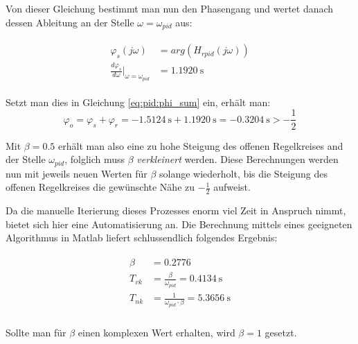 Von dieser Gleichung bestimmt man nun den Phasengang und wertet danach dessen
Ableitung an der Stelle $\omega = \omega_{pid}$ aus:

\begin{gather} \label{eq:pid:phi_r_first_iteration}
    \begin{split}
        \varphi_s (j\omega)                                            & = arg(H_{rpid}(j\omega))        \\
        \frac{d\varphi_s}{d\omega} \biggr \rvert_{\omega=\omega_{pid}} & = \SI{1.1920}{\second}
    \end{split}
\end{gather}


Setzt man dies in Gleichung \ref{eq:pid:phi_sum} ein, erh\"alt man:
\begin{equation} \label{eq:pid:phi_sum_result_iteration_one}
    \varphi_o = \varphi_s + \varphi_r =\SI{-1.5124}{\second} + \SI{1.1920}{\second} = \SI{-0.3204}{\second} > -\frac{1}{2}
\end{equation}

Mit  $\beta  = 0.5$  erh\"alt  man  also eine  zu  hohe  Steigung des  offenen
Regelkreises   and   der   Stelle  $\omega_{pid}$,   folglich   muss   $\beta$
{\em{verkleinert}} werden.   Diese Berechnungen  werden nun mit  jeweils neuen
Werten  f\"ur  $\beta$  solange  wiederholt,  bis  die  Steigung  des  offenen
Regelkreises die gew\"unschte N\"ahe zu $-\frac{1}{2}$ aufweist.

Da die manuelle Iterierung dieses Prozesses enorm viel Zeit in Anspruch nimmt,
bietet  sich  hier  eine  Automatisierung  an. Die  Berechnung  mittels  eines
geeigneten Algorithmus in Matlab liefert schlussendlich folgendes Ergebnis:

\begin{gather} \label{eq:pid:beta_result}
    \begin{split}
        \beta    & = 0.2776 \\
        {T_{vk}} & = \frac{\beta}{\omega_{pid}}           = \SI{0.4134}{\second} \\
        {T_{nk}} & = \frac{1}{\omega_{pid} \cdot \beta}   = \SI{5.3656}{\second} \\
    \end{split}
\end{gather}

Sollte  man  f\"ur  $\beta$  einen komplexen  Wert  erhalten,  wird  $\beta=1$
gesetzt.

